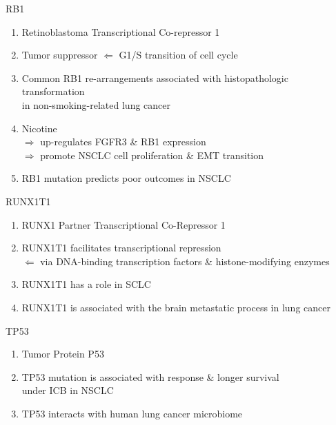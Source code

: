 \documentclass{beamer}
\begin{document}
\begin{frame}[allowframebreaks]
        \begin{block}{RB1}
            \begin{enumerate}
                \item Retinoblastoma Transcriptional Co-repressor 1
                \item Tumor suppressor $\Leftarrow$ G1/S transition of cell cycle \cite{RB1-1}
                \item Common RB1 re-arrangements associated with histopathologic transformation \\
                in non-smoking-related lung cancer \cite{RB1-2}
                \item Nicotine \\
                    $\Rightarrow$ up-regulates FGFR3 \& RB1 expression \\
                    $\Rightarrow$ promote NSCLC cell proliferation \& EMT transition \cite{RB1-3}
                \item RB1 mutation predicts poor outcomes in NSCLC \cite{RB1-4}
            \end{enumerate}
        \end{block}

        \begin{block}{RUNX1T1}
            \begin{enumerate}
                \item RUNX1 Partner Transcriptional Co-Repressor 1
                \item RUNX1T1 facilitates transcriptional repression \\
                    $\Leftarrow$ via DNA-binding transcription factors \& histone-modifying enzymes \cite{RUNX1T1-1, RUNX1T1-2, RUNX1T1-3}
                \item RUNX1T1 has a role in SCLC \cite{RUNX1T1-4}
                \item RUNX1T1 is associated with the brain metastatic process in lung cancer \cite{RUNX1T1-5}
            \end{enumerate}
        \end{block}

        \begin{block}{TP53}
            \begin{enumerate}
                \item Tumor Protein P53
                \item TP53 mutation is associated with response \& longer survival \\
                under ICB in NSCLC \cite{TP53-1}
                \item TP53 interacts with human lung cancer microbiome \cite{TP53-2}
            \end{enumerate}
        \end{block}
        \framebreak
    \end{frame}
\end{document}
